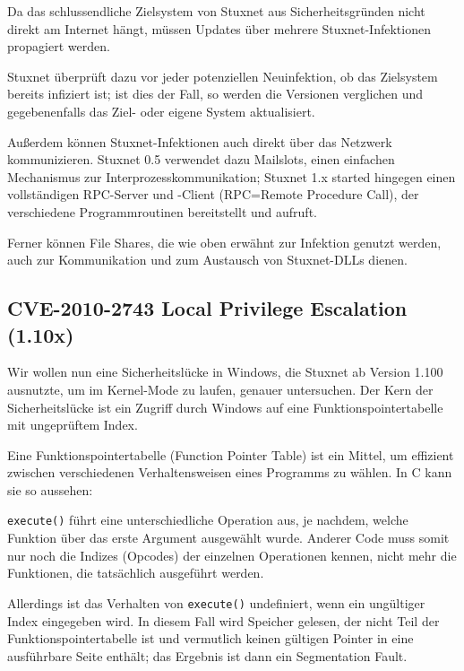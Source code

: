 \documentclass[a4paper]{article}
\begin{document}
Da das schlussendliche Zielsystem von Stuxnet aus Sicherheitsgründen nicht direkt am Internet hängt,
müssen Updates über mehrere Stuxnet-Infektionen propagiert werden.

Stuxnet überprüft dazu vor jeder potenziellen Neuinfektion, ob das Zielsystem bereits infiziert ist;
ist dies der Fall, so werden die Versionen verglichen und gegebenenfalls das Ziel- oder eigene System aktualisiert.

Außerdem können Stuxnet-Infektionen auch direkt über das Netzwerk kommunizieren.
Stuxnet 0.5 verwendet dazu Mailslots, einen einfachen Mechanismus zur Interprozesskommunikation;
Stuxnet 1.x started hingegen einen vollständigen RPC-Server und -Client (RPC=Remote Procedure Call), %
der verschiedene Programmroutinen bereitstellt und aufruft.

Ferner können File Shares, die wie oben erwähnt zur Infektion genutzt werden,
auch zur Kommunikation und zum Austausch von Stuxnet-DLLs dienen.

\subsection{CVE-2010-2743 Local Privilege Escalation (1.10x)}

Wir wollen nun eine Sicherheitslücke in Windows, die Stuxnet ab Version 1.100 ausnutzte, um im Kernel-Mode zu laufen, genauer untersuchen.
Der Kern der Sicherheitslücke ist ein Zugriff durch Windows auf eine Funktionspointertabelle mit ungeprüftem Index.

Eine Funktionspointertabelle (Function Pointer Table) ist ein Mittel,
um effizient zwischen verschiedenen Verhaltensweisen eines Programms zu wählen.
In C kann sie so aussehen:



\texttt{execute()} führt eine unterschiedliche Operation aus, je nachdem, welche Funktion über das erste Argument ausgewählt wurde.
Anderer Code muss somit nur noch die Indizes (Opcodes) der einzelnen Operationen kennen, nicht mehr die Funktionen, die tatsächlich ausgeführt werden.

Allerdings ist das Verhalten von \texttt{execute()} undefiniert, wenn ein ungültiger Index eingegeben wird.
In diesem Fall wird Speicher gelesen, der nicht Teil der Funktionspointertabelle ist und vermutlich keinen gültigen Pointer in eine ausführbare Seite enthält;
das Ergebnis ist dann ein Segmentation Fault.
\end{document}

